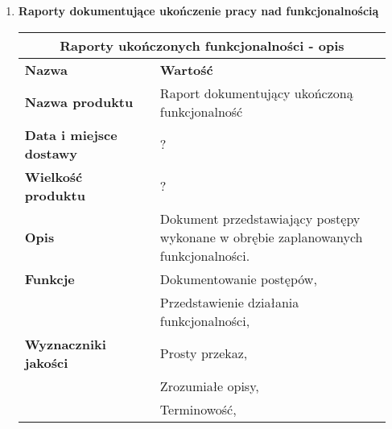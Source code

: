 \documentclass[12pt,a4paper]{article}
\begin{document}
\begin{enumerate}
    \item \textbf{Raporty dokumentujące ukończenie pracy nad funkcjonalnością}
    \begin{table}[htb]
    \centering
      \begin{tabular}{|p{0.35\linewidth} | p{0.6\linewidth}|}
      \hline
      \multicolumn{2}{|c|}{Raporty ukończonych funkcjonalności - opis} \\
      \hline
      {\bf Nazwa} & {\bf Wartość} \\
      \hline
      \textbf{Nazwa produktu} & Raport dokumentujący ukończoną funkcjonalność \\
      \hline
      \textbf{Data i miejsce dostawy} & ? \\
      \hline
      \textbf{Wielkość produktu} & ? \\
      \hline
      \textbf{Opis} & Dokument przedstawiający postępy wykonane w obrębie zaplanowanych funkcjonalności.  \\
      \hline
      \textbf{Funkcje} 
                      & Dokumentowanie postępów, \\
                      & Przedstawienie działania funkcjonalności, \\
      
      \hline
      \textbf{Wyznaczniki jakości} 
                      & Prosty przekaz, \\
                      & Zrozumiałe opisy, \\
                      & Terminowość, \\
      

\end{tabular}
\end{table}
\end{enumerate}
\end{document}
